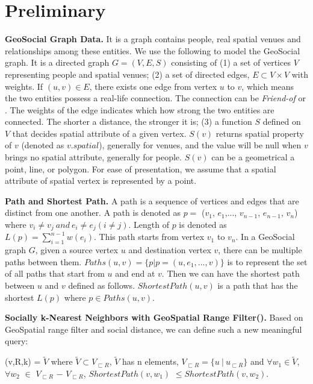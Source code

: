 \section{Preliminary}
\label{sec:preliminary}


{\bf GeoSocial Graph Data.} It is a graph contains people, real spatial venues and relationships among these entities. We use the following to model the GeoSocial graph. It is a directed graph $G=(V,E,S)$ consisting of (1) a set of vertices $V$ representing people and spatial venues; (2) a set of directed edges, $E\subset V\times V$ with weights. If $(u,v)\in E$, there exists one edge from vertex $u$ to $v$, which means the two entities possess a real-life connection. The connection can be {\em Friend-of} or {\Like}. The weights of the edge indicates which how strong the two entities are connected. The shorter a distance, the stronger it is; (3) a function $S$ defined on $V$ that decides spatial attribute of a given vertex. $S(v)$ returns spatial property of $v$ (denoted as $v.spatial$), generally for venues, and the value will be null when $v$ brings no spatial attribute, generally for people. $S(v)$ can be a geometrical a point, line, or polygon. For ease of presentation, we assume that a spatial attribute of spatial vertex is represented by a point.

\textbf{Path and Shortest Path.} A path is a sequence of vertices and edges that are distinct from one another. A path is denoted as $p =$ ($v_1$, $e_1$,..., $v_{n-1}$, $e_{n-1}$, $v_n$) where $v_i\neq v_j~and~e_i\neq e_j (i\neq j)$. Length of $p$ is denoted as $L(p) = \sum\limits_{i = 1}^{n-1}w(e_i)$. This path starts from vertex $v_1$ to $v_n$. In a GeoSocial graph $G$, given a source vertex $u$ and destination vertex $v$, there can be multiple paths between them. $Paths(u,v) = \{p|p = (u,e_1,..., v)\}$ is to represent the set of all paths that start from $u$ and end at $v$. Then we can have the shortest path between $u$ and $v$ defined as follows. $ShortestPath(u,v)$ is a path that has the shortest $L(p)$ where $p\in Paths(u,v)$.

\textbf{Socially k-Nearest Neighbors with GeoSpatial Range Filter({\query}).} Based on GeoSpatial range filter and social distance, we can define such a new meaningful query:
\begin{defn}
	{\query}(v,R,k) = $\widetilde{V}$ where $\widetilde{V}\subset V_{\sqsubset R}$, $\widetilde{V}$ has n elements, $V_{\sqsubset R} = \{u~|~u_{\sqsubset R}\}$ and $\forall w_1\in \widetilde{V}$, $\forall w_2$ $\in$ $V_{\sqsubset R}$ $-$ $V_{\sqsubset R}$, $ShortestPath(v,w_1)$ $\leqslant ShortestPath(v,w_2)$.
\end{defn}

